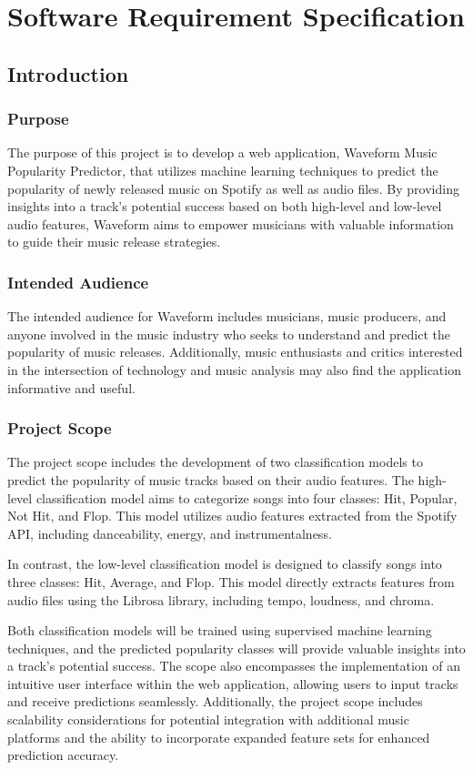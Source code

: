 \documentclass[11pt]{report}
\begin{document}
\chapter{Software Requirement Specification}
\section{Introduction}
 \subsection{Purpose}
  The purpose of this project is to develop a web application, Waveform Music Popularity Predictor, that utilizes machine learning techniques to predict the popularity of newly released music on Spotify as well as audio files. By providing insights into a track's potential success based on both high-level and low-level audio features, Waveform aims to empower musicians with valuable information to guide their music release strategies.
   
 \subsection{Intended Audience}    
 The intended audience for Waveform includes musicians, music producers, and anyone involved in the music industry who seeks to understand and predict the popularity of music releases. Additionally, music enthusiasts and critics interested in the intersection of technology and music analysis may also find the application informative and useful.

 \subsection{Project Scope}    
    The project scope includes the development of two classification models to predict the popularity of music tracks based on their audio features. The high-level classification model aims to categorize songs into four classes: Hit, Popular, Not Hit, and Flop. This model utilizes audio features extracted from the Spotify API, including danceability, energy, and instrumentalness.

In contrast, the low-level classification model is designed to classify songs into three classes: Hit, Average, and Flop. This model directly extracts features from audio files using the Librosa library, including tempo, loudness, and chroma.

Both classification models will be trained using supervised machine learning techniques, and the predicted popularity classes will provide valuable insights into a track's potential success. The scope also encompasses the implementation of an intuitive user interface within the web application, allowing users to input tracks and receive predictions seamlessly. Additionally, the project scope includes scalability considerations for potential integration with additional music platforms and the ability to incorporate expanded feature sets for enhanced prediction accuracy.
  
\end{document}
